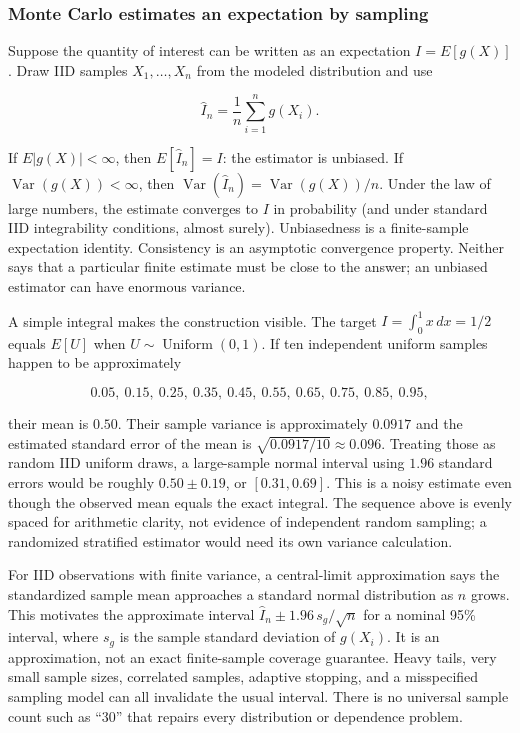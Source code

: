 \subsubsection{Monte Carlo estimates an expectation by sampling}\label{monte-carlo-estimates-an-expectation-by-sampling}

Suppose the quantity of interest can be written as an expectation \(I=E[g(X)]\). Draw IID samples \(X_1,\ldots,X_n\) from the modeled distribution and use

\[
\hat I_n=\frac{1}{n}\sum_{i=1}^n g(X_i).
\]

If \(E|g(X)|<\infty\), then \(E[\hat I_n]=I\): the estimator is unbiased. If \(\operatorname{Var}(g(X))<\infty\), then \(\operatorname{Var}(\hat I_n)=\operatorname{Var}(g(X))/n\). Under the law of large numbers, the estimate converges to \(I\) in probability (and under standard IID integrability conditions, almost surely). Unbiasedness is a finite-sample expectation identity. Consistency is an asymptotic convergence property. Neither says that a particular finite estimate must be close to the answer; an unbiased estimator can have enormous variance.

A simple integral makes the construction visible. The target \(I=\int_0^1 x\,dx=1/2\) equals \(E[U]\) when \(U\sim\operatorname{Uniform}(0,1)\). If ten independent uniform samples happen to be approximately

\[
0.05,\ 0.15,\ 0.25,\ 0.35,\ 0.45,\ 0.55,\ 0.65,\ 0.75,\ 0.85,\ 0.95,
\]

their mean is \(0.50\). Their sample variance is approximately \(0.0917\) and the estimated standard error of the mean is \(\sqrt{0.0917/10}\approx0.096\). Treating those as random IID uniform draws, a large-sample normal interval using \(1.96\) standard errors would be roughly \(0.50\pm0.19\), or \([0.31,0.69]\). This is a noisy estimate even though the observed mean equals the exact integral. The sequence above is evenly spaced for arithmetic clarity, not evidence of independent random sampling; a randomized stratified estimator would need its own variance calculation.

For IID observations with finite variance, a central-limit approximation says the standardized sample mean approaches a standard normal distribution as \(n\) grows. This motivates the approximate interval \(\hat I_n\pm1.96\,s_g/\sqrt n\) for a nominal 95\% interval, where \(s_g\) is the sample standard deviation of \(g(X_i)\). It is an approximation, not an exact finite-sample coverage guarantee. Heavy tails, very small sample sizes, correlated samples, adaptive stopping, and a misspecified sampling model can all invalidate the usual interval. There is no universal sample count such as ``30'' that repairs every distribution or dependence problem.

